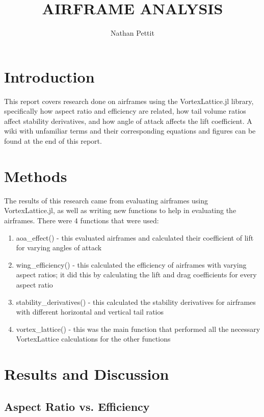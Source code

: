 \documentclass{journal}
\title{AIRFRAME ANALYSIS}
\author{Nathan Pettit}
\begin{document}
	
	\maketitle	
	
	\section{Introduction}
	
	This report covers research done on airframes using the VortexLattice.jl library, specifically how aspect ratio and efficiency are related, how tail volume ratios affect stability derivatives, and how angle of attack affects the lift coefficient. A wiki with unfamiliar terms and their corresponding equations and figures can be found at the end of this report.
	
	\section{Methods}
	The results of this research came from evaluating airframes using VortexLattice.jl, as well as writing new functions to help in evaluating the airframes. There were 4 functions that were  used:
	
	\begin{enumerate}
		\item aoa\_effect() - this evaluated airframes and calculated their coefficient of lift for varying angles of attack 
		\item wing\_efficiency() - this calculated the efficiency of airframes with varying aspect ratios; it did this by calculating the lift and drag coefficients for every aspect ratio
		\item stability\_derivatives() - this calculated the stability derivatives for airframes with different horizontal and vertical tail ratios
		\item vortex\_lattice() - this was the main function that performed all the necessary VortexLattice calculations for the other functions 
	\end{enumerate}
	
	\section{Results and Discussion}
	
	\subsection{Aspect Ratio vs. Efficiency}
	
\end{document}
